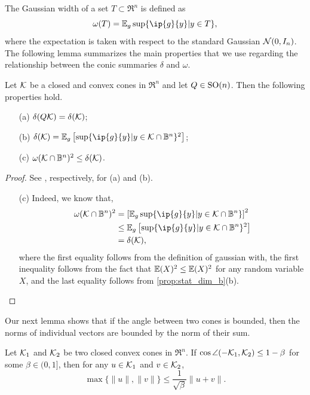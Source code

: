 The Gaussian width of a set $T \subset \Re^n$ is defined as
\[\omega(T) = \mE_{g} \sup\{ \ip{g}{y} | y\in T\},\]
where the expectation is taken with respect to the standard Gaussian $\mathcal{N}(0,I_n)$. 
The following lemma summarizes the main properties that we use regarding the relationship between the conic summaries $\delta$ and $\omega$.

\begin{lemma}\label{prop:stat_dim}
    Let $\mathcal{K}$ be a closed and convex cones in $\Re^n$ and let $Q\in\operatorname{SO}(n)$. Then the following properties hold. 
    \begin{itemize}
      \item[(a)] \label{prop:stat_dim_a} $\delta(Q\mathcal{K}) = \delta(\mathcal{K})$;
      \item[(b)] \label{prop:stat_dim_b} $\delta(\Kscr) = \mE_g \left[\sup\{ \ip{g}{y} | y\in\Kscr\cap\mB^n\}^2\right]$;
      \item[(c)] \label{prop:stat_dim_c} $\omega(\mathcal{K}\cap\mathbb{B}^n)^2 \leq \delta(\mathcal{K})$.
    \end{itemize}
\end{lemma}

\begin{proof} 
    See \citep[Proposition~3.1(6) and Proposition~3.1(5)]{amelunxen2014living}, respectively, for (a) and (b). 
    \begin{itemize}
      \item[(c)] Indeed, we know that,
      \begin{align*}
        \omega(\Kscr\cap\mB^n)^2 &= \left[\mE_{g} \sup\{ \ip{g}{y} | y\in \Kscr\cap\mB^n\}\right]^2
        \\&\leq \mE_{g} \left[\sup\{ \ip{g}{y} | y\in \Kscr\cap\mB^n\}^2\right]
        \\&= \delta(\Kscr),
      \end{align*}
      where the first equality follows from the definition of gaussian with, the first inequality follows from the fact that $\mathbb{E}(X)^2 \leq \mathbb{E}(X)^2$ for any random variable $X$, and the last equality follows from \autoref{prop:stat_dim_b}(b). 
    \end{itemize}
\end{proof}

Our next lemma shows that if the angle between two cones is bounded, then the norms of individual vectors are bounded by the norm of their sum.

\begin{lemma}\label{lemma:bound_norm}
    Let $\mathcal{K}_1$ and $\mathcal{K}_2$ be two closed convex cones in $\Re^n$. If $\cos\angle(-\mathcal{K}_1, \mathcal{K}_2) \leq 1 - \beta$ for some $\beta \in (0, 1]$, then for any $u \in \mathcal{K}_1$ and $v \in \mathcal{K}_2$, 
    \[\max\{\|u\|, \|v\|\} \leq \frac{1}{\sqrt{\beta}}\|u + v\|.\]
\end{lemma}

